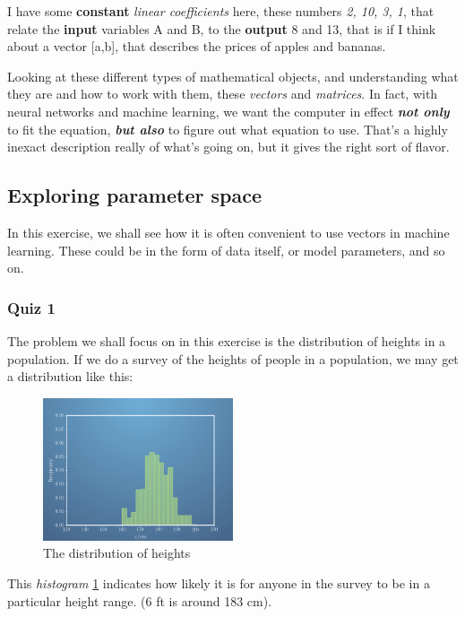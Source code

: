 \documentclass[]{article}
\begin{document}
I have some \textbf{constant} \textit{linear coefficients} here, these numbers \textit{2, 10, 3, 1}, that relate the \textbf{input} variables A and B, to the \textbf{output} 8 and 13, that is if I think about a vector [a,b], that describes the prices of apples and bananas.

Looking at these different types of mathematical objects, and understanding what they are and how to work with them, these \textit{vectors} and \textit{matrices}. In fact, with neural networks and machine learning, we want the computer in effect \textbf{\textit{not only}} to fit the equation, \textbf{\textit{but also}} to figure out what equation to use. That's a highly inexact description really of what's going on, but it gives the right sort of flavor.

\subsection{Exploring parameter space}

In this exercise, we shall see how it is often convenient to use vectors in machine learning. These could be in the form of data itself, or model parameters, and so on.

\subsubsection{Quiz 1}

The problem we shall focus on in this exercise is the distribution of heights in a population. If we do a survey of the heights of people in a population, we may get a distribution like this:

\begin{figure}[h]
	\centering
	\includegraphics[width=0.5\textwidth]{height_dist}
	\caption{The distribution of heights}
	\label{fig:height_dist}
\end{figure}

This \textit{histogram} \ref{fig:height_dist} indicates how likely it is for anyone in the survey to be in a particular height range. (6 ft is around 183 cm).
\end{document}
